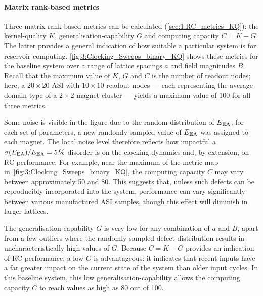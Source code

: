 \paragraph{Matrix rank-based metrics}
Three matrix rank-based metrics can be calculated (\cref{sec:1:RC_metrics_KQ}): the kernel-quality $K$, generalisation-capability $G$ and computing capacity $C=K-G$.
The latter provides a general indication of how suitable a particular system is for reservoir computing.
\cref{fig:3:Clocking_Sweeps_binary_KQ} shows these metrics for the baseline system over a range of lattice spacings $a$ and field magnitudes $B$.
Recall that the maximum value of $K$, $G$ and $C$ is the number of readout nodes; here, a $20 \times 20$ ASI with $10 \times 10$ readout nodes --- each representing the average domain type of a $2 \times 2$ magnet cluster --- yields a maximum value of 100 for all three metrics.

\vspace{-1em}

Some noise is visible in the figure due to the random distribution of $E_\mathrm{EA}$; for each set of parameters, a new randomly sampled value of $E_\mathrm{EA}$ was assigned to each magnet.
The local noise level therefore reflects how impactful a $\sigma(E_\mathrm{EA})/E_\mathrm{EA} = \SI{5}{\percent}$ disorder is on the clocking dynamics and, by extension, on RC performance.
For example, near the maximum of the metric map in~\cref{fig:3:Clocking_Sweeps_binary_KQ}, the computing capacity $C$ may vary between approximately 50 and 80.
This suggests that, unless such defects can be reproducibly incorporated into the system, performance can vary significantly between various manufactured ASI samples, though this effect will diminish in larger lattices. \par
The generalisation-capability $G$ is very low for any combination of $a$ and $B$, apart from a few outliers where the randomly sampled defect distribution results in uncharacteristically high values of $G$.
Because $C=K-G$ provides an indication of RC performance, a low $G$ is advantageous: it indicates that recent inputs have a far greater impact on the current state of the system than older input cycles.
In this baseline system, this low generalisation-capability allows the computing capacity $C$ to reach values as high as 80 out of 100.

